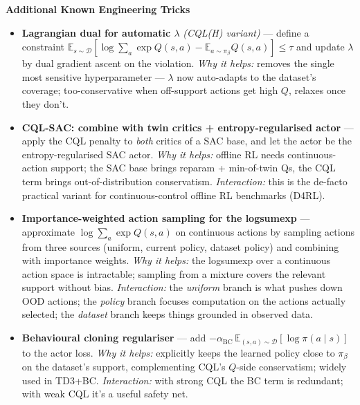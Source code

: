 \documentclass[11pt]{article}
\begin{document}
    \label{tricks-4-8}

    \textbf{Additional Known Engineering Tricks}

\begin{itemize}
\item
  \label{trick-4-8-1}\textbf{Lagrangian dual for
  automatic \(\lambda\)} \emph{(CQL(H) variant)} --- define a constraint
  \(\mathbb{E}_{s\sim\mathcal{D}}[\log\sum_a \exp Q(s,a) - \mathbb{E}_{a\sim\pi_\beta}Q(s,a)] \le \tau\)
  and update \(\lambda\) by dual gradient ascent on the violation.
  \emph{Why it helps:} removes the single most sensitive hyperparameter
  --- \(\lambda\) now auto-adapts to the dataset's coverage;
  too-conservative when off-support actions get high \(Q\), relaxes once
  they don't.
\item
  \label{trick-4-8-2}\textbf{CQL-SAC: combine with twin
  critics + entropy-regularised actor} --- apply the CQL penalty to
  \emph{both} critics of a SAC base, and let the actor be the
  entropy-regularised SAC actor. \emph{Why it helps:} offline RL needs
  continuous-action support; the SAC base brings reparam + min-of-twin
  Qs, the CQL term brings out-of-distribution conservatism.
  \emph{Interaction:} this is the de-facto practical variant for
  continuous-control offline RL benchmarks (D4RL).
\item
  \label{trick-4-8-3}\textbf{Importance-weighted action
  sampling for the logsumexp} --- approximate \(\log\sum_a \exp Q(s,a)\)
  on continuous actions by sampling actions from three sources (uniform,
  current policy, dataset policy) and combining with importance weights.
  \emph{Why it helps:} the logsumexp over a continuous action space is
  intractable; sampling from a mixture covers the relevant support
  without bias. \emph{Interaction:} the \emph{uniform} branch is what
  pushes down OOD actions; the \emph{policy} branch focuses computation
  on the actions actually selected; the \emph{dataset} branch keeps
  things grounded in observed data.
\item
  \label{trick-4-8-4}\textbf{Behavioural cloning
  regulariser} --- add
  \(-\alpha_\text{BC}\,\mathbb{E}_{(s,a)\sim\mathcal{D}}[\log\pi(a\mid s)]\)
  to the actor loss. \emph{Why it helps:} explicitly keeps the learned
  policy close to \(\pi_\beta\) on the dataset's support, complementing
  CQL's \(Q\)-side conservatism; widely used in TD3+BC.
  \emph{Interaction:} with strong CQL the BC term is redundant; with
  weak CQL it's a useful safety net.

\end{itemize}
\end{document}
